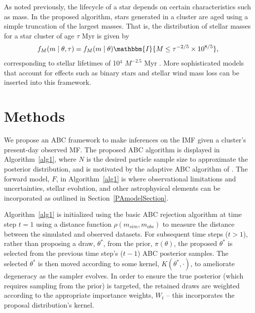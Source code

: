 \documentclass[12pt]{article}
\newcommand{\indic}{\mathbbm{I}}
\begin{document}
As noted previously, the lifecycle of a star depends on certain characteristics such as mass.  In the proposed algorithm, stars generated in a cluster are aged using a simple truncation of the largest masses.  
That is, the distribution of stellar masses for a star cluster of age $\tau$ Myr is given by
	\begin{align}
	f_M(m \mid \theta, \tau) = f_M(m \mid \theta) \indic \{M \leq \tau^{-2/5} \times 10^{8/5}\} \text{,}
	\label{eq:age}
	\end{align}
corresponding to stellar lifetimes of 10$^4$ $M^{-2.5}$ Myr \citep{hansen2004}. 
More sophisticated models that account for effects such as binary stars and stellar wind mass loss can be inserted into this framework.  



\section{Methods}
\label{methodSec}

We propose an ABC framework to make inferences on the IMF given a cluster's present-day observed MF.  The proposed ABC algorithm is displayed in Algorithm~\eqref{alg1}, where $N$ is the desired particle sample size to approximate the posterior distribution, and is motivated by the adaptive ABC algorithm of \cite{beaumont2009}.  The forward model, $F$, in Algorithm~\eqref{alg1} is where observational limitations and uncertainties, stellar evolution, and other astrophysical elements can be incorporated as outlined in Section~\ref{PAmodelSection}.



Algorithm~\eqref{alg1} is initialized using the basic ABC rejection algorithm at time step $t = 1$ using a distance function $\rho(m_{sim}, m_{obs})$ to measure the distance between the simulated and observed datasets. For subsequent time steps ($t > 1$), rather than proposing a draw, $\theta^*$, from the prior, $\pi(\theta)$, the proposed $\theta^*$ is selected from the previous time step's ($t-1$) ABC posterior samples.  The selected $\theta^*$ is then moved according to some kernel, $K(\theta^*, \cdot)$, to ameliorate degeneracy as the sampler evolves.  In order to ensure the true posterior (which requires sampling from the prior) is targeted, the retained draws are weighted according to the appropriate importance weights, $W_t$ -- this incorporates the proposal distribution's kernel.
\end{document}
